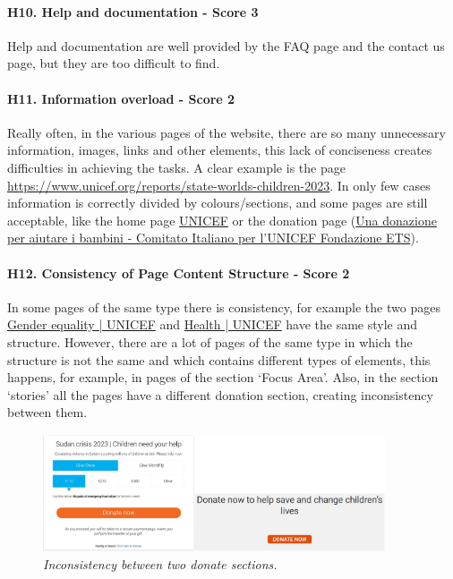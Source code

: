 \newline
\newline \paragraph{H10. Help and documentation - Score 3}  \label{subsec:H10}	Help and documentation are well provided by the FAQ page and the contact us page, but they are too difficult to find.
\newline
\newline \paragraph{H11. Information overload - Score 2}  \label{subsec:H11}	Really often, in the various pages of the website, there are so many unnecessary information, images, links and other elements, this lack of conciseness creates difficulties in achieving the tasks. A clear example is the page \href{https://www.unicef.org/reports/state-worlds-children-2023}{https://www.unicef.org/reports/state-worlds-children-2023}.
\newline In only few cases information is correctly divided by colours/sections, and some pages are still acceptable, like the home page \href{https://www.unicef.org/}{UNICEF} or the donation page (\href{https://donazioni.unicef.it}{Una donazione per aiutare i bambini - Comitato Italiano per l'UNICEF Fondazione ETS}).
\newline
\newline \paragraph{H12. Consistency of Page Content Structure - Score 2}  \label{subsec:H12}	In some pages of the same type there is consistency, for example the two pages \href{https://www.unicef.org/gender-equality}{Gender equality | UNICEF} and \href{https://www.unicef.org/health}{Health | UNICEF} have the same style and structure.
\newline However, there are a lot of pages of the same type in which the structure is not the same and which contains different types of elements, this happens, for example, in pages of the section ‘Focus Area’.
\newline Also, in the section ‘stories’ all the pages have a different donation section, creating inconsistency between them.
\begin{figure}[!h]
	\begin{center}
		\includegraphics[width=0.9\textwidth]{FinalScores16.jpg}
		\captionsetup{font=small}
		\caption{\textit{Inconsistency between two donate sections.}}
	\end{center}
\end{figure}
